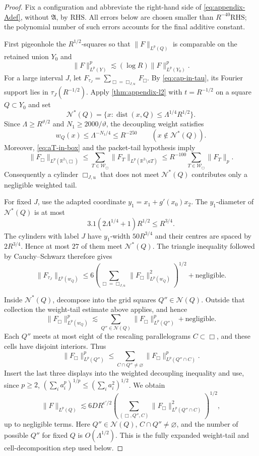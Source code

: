 \documentclass[10pt,a4paper]{amsart}
\newcommand{\dist}{\operatorname{dist}}
\begin{document}
\begin{proof}
Fix a configuration and abbreviate the right-hand side of
\eqref{eq:appendix-Adef}, without $\mathfrak A$, by $\mathrm{RHS}$.  All
errors below are chosen smaller than $R^{-40}\mathrm{RHS}$; the polynomial
number of such errors accounts for the final additive constant.

First pigeonhole the $R^{1/2}$-squares so that
$\|F\|_{L^p(Q)}$ is comparable on the retained union $Y_0$ and
\begin{equation}\label{eq:appendix-square-pigeonhole}
 \|F\|_{L^p(Y)}^p\lesssim(\log R)\|F\|_{L^p(Y_0)}^p.
\end{equation}
For a large interval $J$, let
$F_{\tau_J}=\sum_{\Box=\Box_{J,u}}F_\Box$.  By
\eqref{eq:cap-in-tau}, its Fourier support lies in
$\tau_J(R^{-1/2})$.  Apply \cref{thm:appendix-l2} with $t=R^{-1/2}$ on a
square $Q\subset Y_0$ and set
\[
 \mathcal N^*(Q)
 =\{x:\dist(x,Q)\le\Lambda^{1/4}R^{1/2}\}.
\]
Since $\Lambda\ge R^{\vartheta/2}$ and
$N_1\ge2000/\vartheta$, the decoupling weight satisfies
\[
 w_Q(x)\le \Lambda^{-N_1/4}\le R^{-250}
 \qquad(x\notin\mathcal N^*(Q)).
\]
Moreover, \eqref{eq:aT-in-box} and the packet-tail hypothesis imply
\[
 \|F_\Box\|_{L^p(\mathbb R^2\setminus\Box)}
 \le \sum_{T\in\mathcal W_\Box}
       \|F_T\|_{L^p(\mathbb R^2\setminus aT)}
 \le R^{-100}\sum_{T\in\mathcal W_\Box}\|F_T\|_p.
\]
Consequently a cylinder $\Box_{J,u}$ that does not meet
$\mathcal N^*(Q)$ contributes only a negligible weighted tail.

For fixed $J$, use the adapted coordinate
$y_1=x_1+g'(x_0)x_2$.  The $y_1$-diameter of
$\mathcal N^*(Q)$ is at most
\[
 3.1(2\Lambda^{1/4}+1)R^{1/2}\le R^{3/4}.
\]
The cylinders with label $J$ have $y_1$-width $50R^{3/4}$ and their
centres are spaced by $2R^{3/4}$.  Hence at most $27$ of them meet
$\mathcal N^*(Q)$.  The triangle inequality followed by Cauchy--Schwarz
therefore gives
\[
 \|F_{\tau_J}\|_{L^p(w_Q)}
 \le 6\left(\sum_{\Box=\Box_{J,u}}
          \|F_\Box\|_{L^p(w_Q)}^2\right)^{1/2}
 +\text{negligible}.
\]

Inside $\mathcal N^*(Q)$, decompose into the grid squares
$Q''\in\mathcal N(Q)$.  Outside that collection the weight-tail estimate
above applies, and hence
\[
 \|F_\Box\|_{L^p(w_Q)}^p
 \lesssim\sum_{Q''\in\mathcal N(Q)}
       \|F_\Box\|_{L^p(Q'')}^p+\text{negligible}.
\]
Each $Q''$ meets at most eight of the rescaling parallelograms
$C\subset\Box$, and these cells have disjoint interiors.  Thus
\[
 \|F_\Box\|_{L^p(Q'')}^p
 \le\sum_{C\cap Q''\ne\varnothing}
       \|F_\Box\|_{L^p(Q''\cap C)}^p.
\]
Insert the last three displays into the weighted decoupling inequality and
use, since $p\ge2$,
$(\sum_i a_i^p)^{1/p}\le(\sum_i a_i^2)^{1/2}$.  We obtain
\begin{equation}\label{eq:appendix-triples}
 \|F\|_{L^p(Q)}
 \lesssim 6D R^{\epsilon'/2}
 \left(
  \sum_{(\Box,Q'',C)}
  \|F_\Box\|_{L^p(Q''\cap C)}^2
 \right)^{1/2},
\end{equation}
up to negligible terms.  Here $Q''\in\mathcal N(Q)$,
$C\cap Q''\ne\varnothing$, and the number of possible $Q''$ for fixed $Q$
is $O(\Lambda^{1/2})$.  This is the fully expanded weight-tail and
cell-decomposition step used below.


\end{proof}
\end{document}
